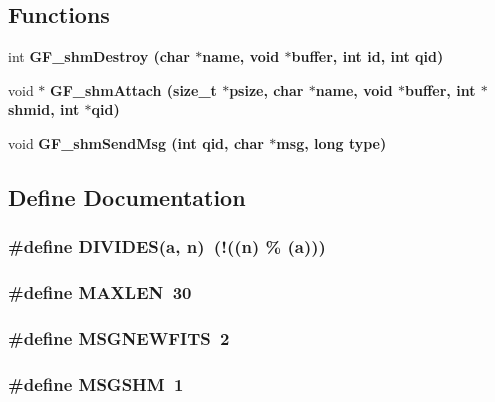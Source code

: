 \subsection*{Functions}
\begin{CompactItemize}
\item 
int \bf{GF\_\-shm\-Destroy} (char $\ast$name, void $\ast$buffer, int id, int qid)
\item 
void $\ast$ \bf{GF\_\-shm\-Attach} (size\_\-t $\ast$psize, char $\ast$name, void $\ast$buffer, int $\ast$\bf{shmid}, int $\ast$qid)
\item 
void \bf{GF\_\-shm\-Send\-Msg} (int qid, char $\ast$msg, long type)
\end{CompactItemize}


\subsection{Define Documentation}
\subsubsection{\setlength{\rightskip}{0pt plus 5cm}\#define DIVIDES(a, \bf{n})~(!((\bf{n}) \% (a)))}\label{GF__shmem_8h_6c9de7e7b7ad3939e52f63063a601820}


\subsubsection{\setlength{\rightskip}{0pt plus 5cm}\#define MAXLEN~30}\label{GF__shmem_8h_e6648cd71a8bd49d58ae8ed33ba910d1}


\subsubsection{\setlength{\rightskip}{0pt plus 5cm}\#define MSGNEWFITS~2}\label{GF__shmem_8h_08348d01b3494d1ddc88e5a3b80c19da}


\subsubsection{\setlength{\rightskip}{0pt plus 5cm}\#define MSGSHM~1}\label{GF__shmem_8h_daf6ed606a67f73d0696e9bbfc2467f2}


